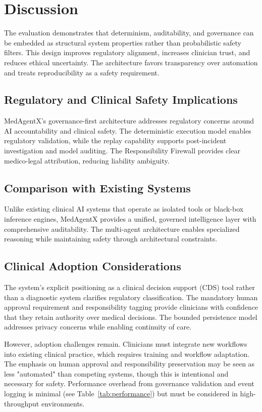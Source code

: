\documentclass[conference]{IEEEtran}
\begin{document}
\section{Discussion}
The evaluation demonstrates that determinism, auditability, and governance can be embedded as structural system properties rather than probabilistic safety filters. This design improves regulatory alignment, increases clinician trust, and reduces ethical uncertainty. The architecture favors transparency over automation and treats reproducibility as a safety requirement.

\subsection{Regulatory and Clinical Safety Implications}
MedAgentX's governance-first architecture addresses regulatory concerns around AI accountability and clinical safety. The deterministic execution model enables regulatory validation, while the replay capability supports post-incident investigation and model auditing. The Responsibility Firewall provides clear medico-legal attribution, reducing liability ambiguity.

\subsection{Comparison with Existing Systems}
Unlike existing clinical AI systems that operate as isolated tools or black-box inference engines, MedAgentX provides a unified, governed intelligence layer with comprehensive auditability. The multi-agent architecture enables specialized reasoning while maintaining safety through architectural constraints.

\subsection{Clinical Adoption Considerations}
The system's explicit positioning as a clinical decision support (CDS) tool rather than a diagnostic system clarifies regulatory classification. The mandatory human approval requirement and responsibility tagging provide clinicians with confidence that they retain authority over medical decisions. The bounded persistence model addresses privacy concerns while enabling continuity of care.

However, adoption challenges remain. Clinicians must integrate new workflows into existing clinical practice, which requires training and workflow adaptation. The emphasis on human approval and responsibility preservation may be seen as less "automated" than competing systems, though this is intentional and necessary for safety. Performance overhead from governance validation and event logging is minimal (see Table~\ref{tab:performance}) but must be considered in high-throughput environments.
\end{document}
